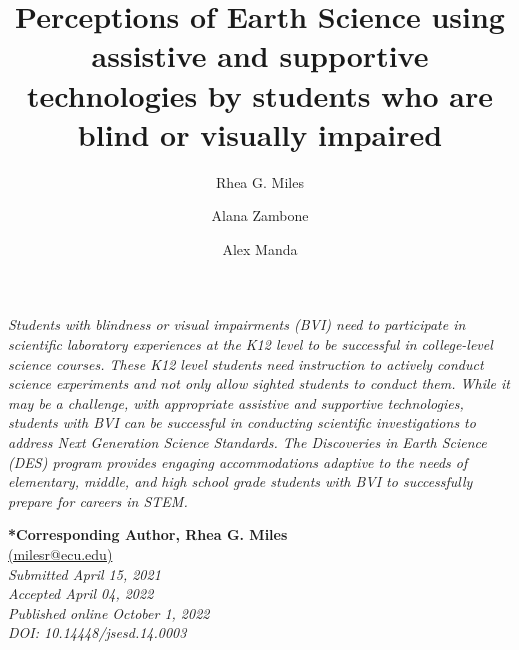 \documentclass[11.5pt]{sig-alternate}
\makeatletter
\let\oldabstract\abstract
\let\oldendabstract\endabstract
\renewenvironment{abstract}
{\renewenvironment{quotation}%
               {\list{}{\addtolength{\leftmargin}{1em} %
                        \listparindent 1.5em%
                        \itemindent    \listparindent%
                        \rightmargin   \leftmargin%
                        \parsep        \z@ \@plus\p@}%
                \item\relax}%
               {\endlist}%
\oldabstract}
{\oldendabstract}
\makeatother
\begin{document}
\title{Perceptions of Earth Science using assistive and supportive technologies by students who are blind or visually impaired}

\author[1]{\large \color{blue} Rhea G. Miles}
\author[1]{\large \color{blue} Alana Zambone}
\author[1]{\large \color{blue}   Alex Manda}


\toappear{}

\maketitle
\begin{@twocolumnfalse} 

    
\begin{abstract}
\item 
    \begin{large}
    \textit{Students with blindness or visual impairments (BVI) need to participate in scientific laboratory experiences at the K12 level to be successful in college-level science courses. These K12 level students need instruction to actively conduct science experiments and not only allow sighted students to conduct them. While it may be a challenge, with appropriate assistive and supportive technologies, students with BVI can be successful in conducting scientific investigations to address Next Generation Science Standards.  The Discoveries in Earth Science (DES) program provides engaging accommodations adaptive to the needs of elementary, middle, and high school grade students with BVI to successfully prepare for careers in STEM.}\\
    \end{large}
\end{abstract}

\end{@twocolumnfalse}




\textbf{*Corresponding Author, Rhea G. Miles}\\ 
\href{mailto:milesr@ecu.edu}{(milesr@ecu.edu)} \\
\textit{Submitted April 15, 2021 }\\
\textit{Accepted April 04, 2022} \\
\textit{Published online October 1, 2022} \\
\textit{DOI: 10.14448/jsesd.14.0003} \\
\end{document}
